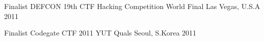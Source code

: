 
\begin{cvhonors}

  \cvhonor
    {Finalist} %
    {DEFCON 19th CTF Hacking Competition World Final} %
    {Las Vegas, U.S.A} %
    {2011} %

  \cvhonor
    {Finalist} %
    {Codegate CTF 2011 YUT Quals} %
    {Seoul, S.Korea} %
    {2011} %

\end{cvhonors}
